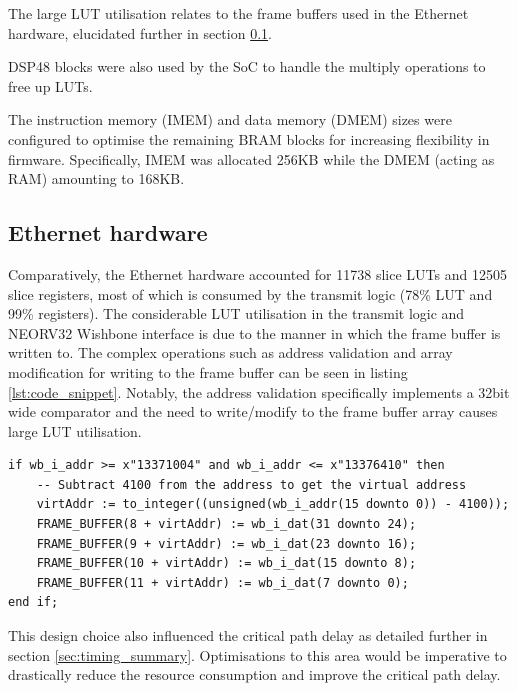 The large LUT utilisation relates to the frame buffers used in the Ethernet hardware, elucidated further in section \ref{sec:eth_hardware_util}. 

DSP48 blocks were also used by the SoC to handle the multiply operations to free up LUTs. 

The instruction memory (IMEM) and data memory (DMEM) sizes were configured to optimise the remaining BRAM blocks for increasing flexibility in firmware. Specifically, IMEM was allocated 256KB while the DMEM (acting as RAM) amounting to 168KB. 





\subsection{Ethernet hardware}
\label{sec:eth_hardware_util}


Comparatively, the Ethernet hardware accounted for 11738 slice LUTs and 12505 slice registers, most of which is consumed by the transmit logic (78\% LUT and 99\% registers). The considerable LUT utilisation in the transmit logic and NEORV32 Wishbone interface is due to the manner in which the frame buffer is written to. The complex operations such as address validation and array modification for writing to the frame buffer can be seen in listing \ref{lst:code_snippet}. Notably, the address validation specifically implements a 32bit wide comparator and the need to write/modify to the frame buffer array causes large LUT utilisation.

\begin{lstlisting}[style=vhdl, caption={Code for writing to the frame buffer}, label=lst:code_snippet]
if wb_i_addr >= x"13371004" and wb_i_addr <= x"13376410" then         
    -- Subtract 4100 from the address to get the virtual address
    virtAddr := to_integer((unsigned(wb_i_addr(15 downto 0)) - 4100));
    FRAME_BUFFER(8 + virtAddr) := wb_i_dat(31 downto 24);
    FRAME_BUFFER(9 + virtAddr) := wb_i_dat(23 downto 16);
    FRAME_BUFFER(10 + virtAddr) := wb_i_dat(15 downto 8);
    FRAME_BUFFER(11 + virtAddr) := wb_i_dat(7 downto 0);
end if;
\end{lstlisting}

This design choice also influenced the critical path delay as detailed further in section \ref{sec:timing_summary}. Optimisations to this area would be imperative to drastically reduce the resource consumption and improve the critical path delay.

